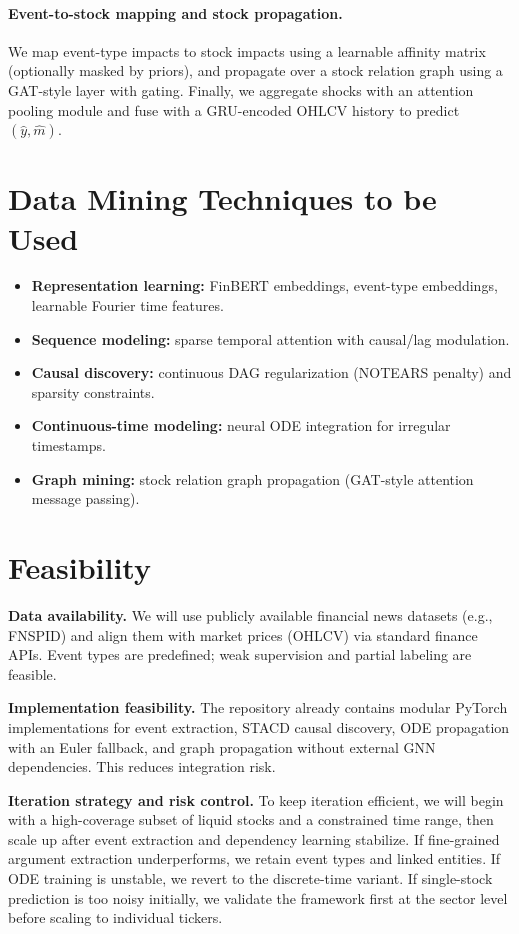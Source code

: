 \documentclass[sigconf,review]{acmart}
\begin{document}
\paragraph{Event-to-stock mapping and stock propagation.} We map event-type impacts to stock impacts using a learnable affinity matrix (optionally masked by priors), and propagate over a stock relation graph using a GAT-style layer with gating. Finally, we aggregate shocks with an attention pooling module and fuse with a GRU-encoded OHLCV history to predict \((\hat{y},\hat{m})\).

\section{Data Mining Techniques to be Used}
\begin{itemize}
\item \textbf{Representation learning:} FinBERT embeddings, event-type embeddings, learnable Fourier time features.
\item \textbf{Sequence modeling:} sparse temporal attention with causal/lag modulation.
\item \textbf{Causal discovery:} continuous DAG regularization (NOTEARS penalty) and sparsity constraints.
\item \textbf{Continuous-time modeling:} neural ODE integration for irregular timestamps.
\item \textbf{Graph mining:} stock relation graph propagation (GAT-style attention message passing).
\end{itemize}

\section{Feasibility}
\textbf{Data availability.} We will use publicly available financial news datasets (e.g., FNSPID) and align them with market prices (OHLCV) via standard finance APIs. Event types are predefined; weak supervision and partial labeling are feasible.

\textbf{Implementation feasibility.} The repository already contains modular PyTorch implementations for event extraction, STACD causal discovery, ODE propagation with an Euler fallback, and graph propagation without external GNN dependencies. This reduces integration risk.

\textbf{Iteration strategy and risk control.} To keep iteration efficient, we will begin with a high-coverage subset of liquid stocks and a constrained time range, then scale up after event extraction and dependency learning stabilize. If fine-grained argument extraction underperforms, we retain event types and linked entities. If ODE training is unstable, we revert to the discrete-time variant. If single-stock prediction is too noisy initially, we validate the framework first at the sector level before scaling to individual tickers.
\end{document}

